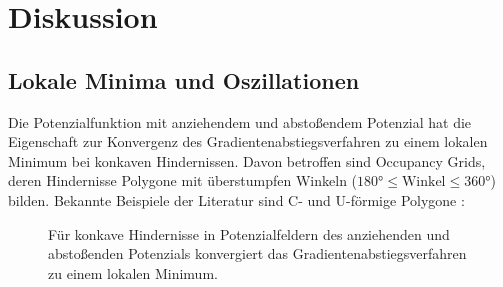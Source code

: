 \chapter{Diskussion}

\section{Lokale Minima und Oszillationen}

Die Potenzialfunktion mit anziehendem und abstoßendem Potenzial hat die Eigenschaft zur Konvergenz des Gradientenabstiegsverfahren zu einem lokalen Minimum bei konkaven Hindernissen.
Davon betroffen sind Occupancy Grids, deren Hindernisse Polygone mit überstumpfen Winkeln ($180\text{°} \le \text{Winkel} \le 360\text{°}$) bilden.
Bekannte Beispiele der Literatur sind C- und U-förmige Polygone \cite{maqbool.2021, yujiang.2017}:
\begin{figure}[h!]
	\centering
	\footnotesize
	\centerline{}
	\caption{Für konkave Hindernisse in Potenzialfeldern des anziehenden und abstoßenden Potenzials konvergiert das Gradientenabstiegsverfahren zu einem lokalen Minimum.}
\end{figure}

